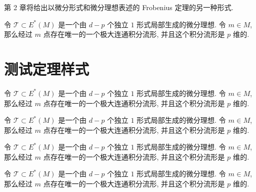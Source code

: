 \begin{remark}
第 2 章将给出以微分形式和微分理想表述的 Frobenius 定理的另一种形式. 
\end{remark}

\begin{thm}[Frobenius定理用微分形式与微分理想表示的形式]
    令 $\mathscr{T} \subset E^*(M)$ 是一个由 $d-p$ 个独立 $1$ 形式局部生成的微分理想. 令 $m \in M$, 那么经过 $m$ 点存在唯一的一个极大连通积分流形, 并且这个积分流形是 $p$ 维的.
\end{thm}

\section{测试定理样式}
\begin{theorem}
    令 $\mathscr{T} \subset E^*(M)$ 是一个由 $d-p$ 个独立 $1$ 形式局部生成的微分理想. 令 $m \in M$, 那么经过 $m$ 点存在唯一的一个极大连通积分流形, 并且这个积分流形是 $p$ 维的.
\end{theorem}

\begin{lemma}
    令 $\mathscr{T} \subset E^*(M)$ 是一个由 $d-p$ 个独立 $1$ 形式局部生成的微分理想. 令 $m \in M$, 那么经过 $m$ 点存在唯一的一个极大连通积分流形, 并且这个积分流形是 $p$ 维的.
\end{lemma}

\begin{definition}
    令 $\mathscr{T} \subset E^*(M)$ 是一个由 $d-p$ 个独立 $1$ 形式局部生成的微分理想. 令 $m \in M$, 那么经过 $m$ 点存在唯一的一个极大连通积分流形, 并且这个积分流形是 $p$ 维的.
\end{definition}

\begin{proposition}
    令 $\mathscr{T} \subset E^*(M)$ 是一个由 $d-p$ 个独立 $1$ 形式局部生成的微分理想. 令 $m \in M$, 那么经过 $m$ 点存在唯一的一个极大连通积分流形, 并且这个积分流形是 $p$ 维的.
\end{proposition}

